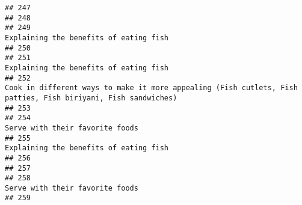 \documentclass[
]{article}
\begin{document}
\begin{verbatim}
## 247                                                                                                                                                                                                             
## 248                                                                                                                                                                                                             
## 249                                                                                                                                                                       Explaining the benefits of eating fish
## 250                                                                                                                                                                                                             
## 251                                                                                                                                                                       Explaining the benefits of eating fish
## 252                                                                                                Cook in different ways to make it more appealing (Fish cutlets, Fish patties, Fish biriyani, Fish sandwiches)
## 253                                                                                                                                                                                                             
## 254                                                                                                                                                                              Serve with their favorite foods
## 255                                                                                                                                                                       Explaining the benefits of eating fish
## 256                                                                                                                                                                                                             
## 257                                                                                                                                                                                                             
## 258                                                                                                                                                                              Serve with their favorite foods
## 259                                                                                                                                                                                                             

\end{verbatim}
\end{document}
